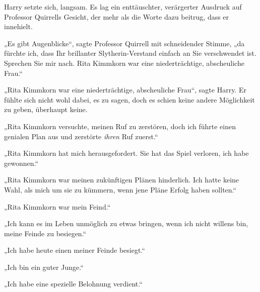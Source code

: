 Harry setzte sich, langsam. Es lag ein enttäuschter, verärgerter Ausdruck auf Professor Quirrells Gesicht, der mehr als die Worte dazu beitrug, dass er innehielt.

„Es gibt Augenblicke“, sagte Professor Quirrell mit schneidender Stimme, „da fürchte ich, dass Ihr brillanter Slytherin-Verstand einfach an Sie verschwendet ist. Sprechen Sie mir nach. Rita Kimmkorn war eine niederträchtige, abscheuliche Frau.“

„Rita Kimmkorn war eine niederträchtige, abscheuliche Frau“, sagte Harry. Er fühlte sich nicht wohl dabei, es zu sagen, doch es schien keine andere Möglichkeit zu geben, überhaupt keine.

„Rita Kimmkorn versuchte, meinen Ruf zu zerstören, doch ich führte einen genialen Plan aus und zerstörte \emph{ihren} Ruf zuerst.“

„Rita Kimmkorn hat mich herausgefordert. Sie hat das Spiel verloren, ich habe gewonnen.“

„Rita Kimmkorn war meinen zukünftigen Plänen hinderlich. Ich hatte keine Wahl, als mich um sie zu kümmern, wenn jene Pläne Erfolg haben sollten.“

„Rita Kimmkorn war mein Feind.“

„Ich kann es im Leben unmöglich zu etwas bringen, wenn ich nicht willens bin, meine Feinde zu besiegen.“

„Ich habe heute einen meiner Feinde besiegt.“

„Ich bin ein guter Junge.“

„Ich habe eine spezielle Belohnung verdient.“


